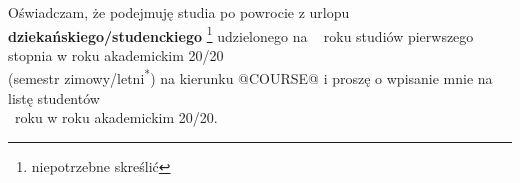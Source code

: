 \documentclass{wmiisubmission}
\begin{document}
\cracowdate
{}
\studentaddress
\addressee{\piotrniemiec}

\vskip 3.0cm


\vskip 0.5cm

Oświadczam, że podejmuję studia po powrocie z urlopu
\textbf{dziekańskiego/studenckiego}
\footnote[1]{niepotrzebne skreślić} udzielonego na \dotfill~ roku
studiów pierwszego stopnia w roku akademickim
20\fillField{0.7cm}/20\fillField{0.7cm}\\
(semestr zimowy/letni\textsuperscript{*})
na kierunku @COURSE@ i proszę o wpisanie mnie na listę studentów\\
\fillField{3cm}
~roku w roku akademickim 20\fillField{0.7cm}/20\fillField{0.7cm}.

\vskip 2.0cm

\studentsignature
\end{document}
